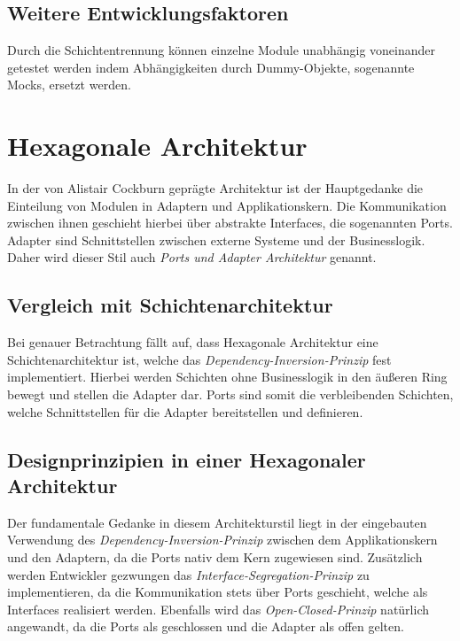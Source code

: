 \documentclass[conference]{IEEEtran}
\begin{document}
\subsection{Weitere Entwicklungsfaktoren}

Durch die Schichtentrennung können einzelne Module unabhängig voneinander getestet werden indem Abhängigkeiten durch Dummy-Objekte, sogenannte Mocks, ersetzt werden. 


\section{Hexagonale Architektur}


In der von Alistair Cockburn geprägte Architektur ist der Hauptgedanke die Einteilung von Modulen in Adaptern und Applikationskern. Die Kommunikation zwischen ihnen geschieht hierbei über abstrakte Interfaces, die sogenannten Ports. Adapter sind Schnittstellen zwischen externe Systeme und der Businesslogik. Daher wird dieser Stil auch \emph{Ports und Adapter Architektur} genannt. 

\subsection{Vergleich mit Schichtenarchitektur}

Bei genauer Betrachtung fällt auf, dass Hexagonale Architektur eine Schichtenarchitektur ist, welche das \emph{Dependency-Inversion-Prinzip} fest implementiert. Hierbei werden Schichten ohne Businesslogik in den äußeren Ring bewegt und stellen die Adapter dar. Ports sind somit die verbleibenden Schichten, welche Schnittstellen für die Adapter bereitstellen und definieren.

\subsection{Designprinzipien in einer Hexagonaler Architektur}
 

Der fundamentale Gedanke in diesem Architekturstil liegt in der eingebauten Verwendung des \emph{Dependency-Inversion-Prinzip} zwischen dem Applikationskern und den Adaptern, da die Ports nativ dem Kern zugewiesen sind. Zusätzlich werden Entwickler gezwungen das \emph{Interface-Segregation-Prinzip} zu implementieren, da die Kommunikation stets über Ports geschieht, welche als Interfaces realisiert werden. Ebenfalls wird das \emph{Open-Closed-Prinzip} natürlich angewandt, da die Ports als geschlossen und die Adapter als offen gelten.
\end{document}
